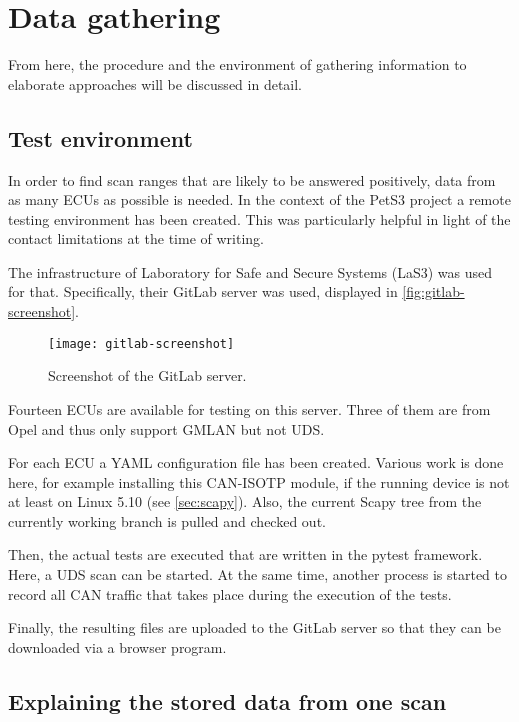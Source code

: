 \section{Data gathering}

From here, the procedure and the environment of gathering information to elaborate approaches will be discussed in detail.

\subsection{Test environment}

In order to find scan ranges that are likely to be answered positively, data from as many ECUs as possible is needed. In the context of the PetS3 project a remote testing environment has been created. This was particularly helpful in light of the contact limitations at the time of writing.

The infrastructure of Laboratory for Safe and Secure Systems (LaS3) was used for that. Specifically, their GitLab server was used, displayed in \autoref{fig:gitlab-screenshot}.

\begin{figure}[h]
    \centering
    \texttt{[image: gitlab-screenshot]}
    \caption{Screenshot of the GitLab server.}
    \label{fig:gitlab-screenshot}
\end{figure}

Fourteen ECUs are available for testing on this server. Three of them are from Opel and thus only support GMLAN but not UDS.

For each ECU a YAML configuration file has been created. Various work is done here, for example installing this CAN-ISOTP module, if the running device is not at least on Linux 5.10 (see \autoref{sec:scapy}). Also, the current Scapy tree from the currently working branch is pulled and checked out.

Then, the actual tests are executed that are written in the pytest framework. Here, a UDS scan can be started. At the same time, another process is started to record all CAN traffic that takes place during the execution of the tests.

Finally, the resulting files are uploaded to the GitLab server so that they can be downloaded via a browser program.

\subsection{Explaining the stored data from one scan}

